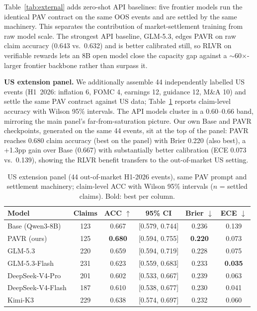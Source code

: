 \documentclass[sigconf, anonymous, review]{acmart}
\begin{document}
Table~\ref{tab:external} adds zero-shot API baselines: five frontier models run the identical PAV contract on the same OOS events and are settled by the same machinery. This separates the contribution of market-settlement training from raw model scale. The strongest API baseline, GLM-5.3, edges PAVR on raw claim accuracy (0.643 vs.\ 0.632) and is better calibrated still, so RLVR on verifiable rewards lets an 8B open model close the capacity gap against a $\sim$60$\times$-larger frontier backbone rather than surpass it.

\textbf{US extension panel.} We additionally assemble 44 independently labelled US events (H1~2026: inflation 6, FOMC 4, earnings 12, guidance 12, M\&A 10) and settle the same PAV contract against US data; Table~\ref{tab:usext} reports claim-level accuracy with Wilson 95\% intervals. The API models cluster in a 0.60--0.66 band, mirroring the main panel's far-from-saturation picture. Our own Base and PAVR checkpoints, generated on the same 44 events, sit at the top of the panel: PAVR reaches 0.680 claim accuracy (best on the panel) with Brier 0.220 (also best), a +1.3pp gain over Base (0.667) with substantially better calibration (ECE 0.073 vs.\ 0.139), showing the RLVR benefit transfers to the out-of-market US setting.

\begin{table}[t]
\centering\footnotesize
\caption{US extension panel (44 out-of-market H1-2026 events), same PAV prompt and settlement machinery; claim-level ACC with Wilson 95\% intervals ($n$ = settled claims). Bold: best per column.}
\label{tab:usext}
\setlength{\tabcolsep}{4pt}
\begin{tabular}{@{}lccccc@{}}
\toprule
Model & Claims & ACC $\uparrow$ & 95\% CI & Brier $\downarrow$ & ECE $\downarrow$ \\
\midrule
Base (Qwen3-8B) & 123 & 0.667 & [0.579, 0.744] & 0.236 & 0.139 \\
PAVR (ours) & 125 & \textbf{0.680} & [0.594, 0.755] & \textbf{0.220} & 0.073 \\
\midrule
GLM-5.3 & 220 & 0.659 & [0.594, 0.719] & 0.228 & 0.075 \\
GLM-5.3-Flash & 231 & 0.623 & [0.559, 0.683] & 0.233 & \textbf{0.035} \\
DeepSeek-V4-Pro & 201 & 0.602 & [0.533, 0.667] & 0.239 & 0.063 \\
DeepSeek-V4-Flash & 187 & 0.610 & [0.538, 0.677] & 0.230 & 0.041 \\
Kimi-K3 & 229 & 0.638 & [0.574, 0.697] & 0.232 & 0.060 \\
\bottomrule
\end{tabular}
\end{table}
\end{document}
